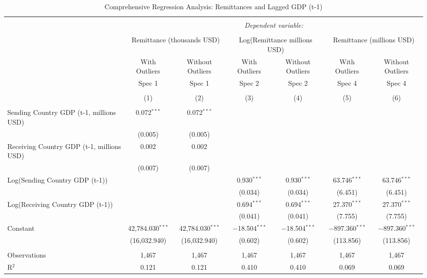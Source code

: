 
\begin{table}[!htbp] \centering
  \caption{Comprehensive Regression Analysis: Remittances and Lagged GDP (t-1)}
  \label{}
\begin{tabular}{@{\extracolsep{5pt}}lcccccc}
\\[-1.8ex]\hline
\hline \\[-1.8ex]
 & \multicolumn{6}{c}{\textit{Dependent variable:}} \\
\cline{2-7}
\\[-1.8ex] & \multicolumn{2}{c}{Remittance (thousands USD)} & \multicolumn{2}{c}{Log(Remittance millions USD)} & \multicolumn{2}{c}{Remittance (millions USD)} \\
 & With Outliers & Without Outliers & With Outliers & Without Outliers & With Outliers & Without Outliers \\
 & Spec 1 & Spec 1 & Spec 2 & Spec 2 & Spec 4 & Spec 4 \\
\\[-1.8ex] & (1) & (2) & (3) & (4) & (5) & (6)\\
\hline \\[-1.8ex]
 Sending Country GDP (t-1, millions USD) & 0.072$^{***}$ & 0.072$^{***}$ & & & & \\
  & (0.005) & (0.005) & & & & \\
 Receiving Country GDP (t-1, millions USD) & 0.002 & 0.002 & & & & \\
  & (0.007) & (0.007) & & & & \\
 Log(Sending Country GDP (t-1)) & & & 0.930$^{***}$ & 0.930$^{***}$ & 63.746$^{***}$ & 63.746$^{***}$ \\
  & & & (0.034) & (0.034) & (6.451) & (6.451) \\
 Log(Receiving Country GDP (t-1)) & & & 0.694$^{***}$ & 0.694$^{***}$ & 27.370$^{***}$ & 27.370$^{***}$ \\
  & & & (0.041) & (0.041) & (7.755) & (7.755) \\
 Constant & 42,784.030$^{***}$ & 42,784.030$^{***}$ & $-$18.504$^{***}$ & $-$18.504$^{***}$ & $-$897.360$^{***}$ & $-$897.360$^{***}$ \\
  & (16,032.940) & (16,032.940) & (0.602) & (0.602) & (113.856) & (113.856) \\
 \hline \\[-1.8ex]
Observations & 1,467 & 1,467 & 1,467 & 1,467 & 1,467 & 1,467 \\
R$^{2}$ & 0.121 & 0.121 & 0.410 & 0.410 & 0.069 & 0.069 \\

\end{tabular}
\end{table}
